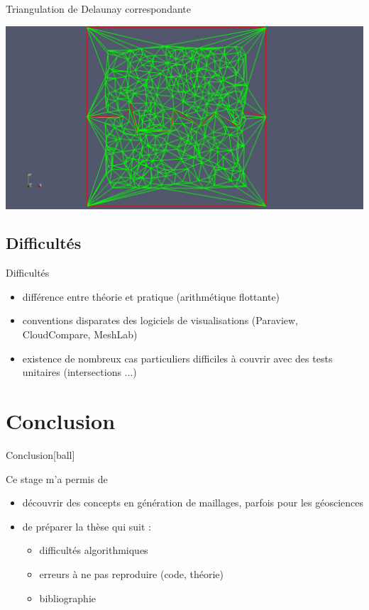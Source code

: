 \documentclass[aspectratio=169, 12pt, a4paper, hyperref={pdfauthor={Alexandre MARIN}, pdfkeywords={IFPEN, Delaunay, Voronoi, mesh generation}, colorlinks=true, linkcolor=purple, urlcolor=blue, citecolor=magenta}]{beamer}
\begin{document}
\begin{Energie}{\normalsize Triangulation de Delaunay correspondante}
\begin{center}\vspace{-1cm}
\includegraphics[scale=0.18, viewport=480 0 1630 1300, clip]{interfaceInSquare.jpg}
\end{center}
\end{Energie}

\subsection{Difficultés}

\begin{Energie}{Difficultés}
\begin{itemize}
\item différence entre théorie et pratique (arithmétique flottante)
\item conventions disparates des logiciels de visualisations (Paraview, CloudCompare, MeshLab)
\item existence de nombreux cas particuliers difficiles à couvrir avec des tests unitaires (intersections $\dots$)
\end{itemize}
\end{Energie}

\section{Conclusion}
\begin{Energie}{Conclusion}[ball]

Ce stage m'a permis de

\begin{itemize}
\item<1-> découvrir des concepts en génération de maillages, parfois pour les géosciences
\item<2-> de préparer la thèse qui suit : 
\begin{itemize}
\item<3-> difficultés algorithmiques
\item<4-> erreurs à ne pas reproduire (code, théorie)
\item<5-> bibliographie
\end{itemize}
\end{itemize}
\end{Energie}
\end{document}
